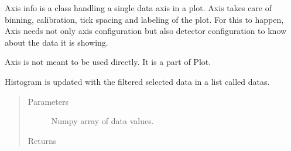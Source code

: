 \documentclass[letterpaper,10pt,english]{sphinxmanual}
\begin{document}
\begin{fulllineitems}
\label{\detokenize{autodocs/plot:listmode.plot.Axis}}
\sphinxAtStartPar
Axis info is a class handling a single data axis in a plot. Axis takes care of binning, calibration, tick spacing
and labeling of the plot. For this to happen, Axis needs not only axis configuration but also detector configuration
to know about the data it is showing.

\sphinxAtStartPar
Axis is not meant to be used directly. It is a part of Plot.

\begin{fulllineitems}
\label{\detokenize{autodocs/plot:listmode.plot.Axis.update}}
\sphinxAtStartPar
Histogram is updated with the filtered selected data in a list called datas.
\begin{quote}\begin{description}
\item[{Parameters}] \leavevmode
\sphinxAtStartPar
{} \textendash{} Numpy array of data values.

\item[{Returns}] \leavevmode
\sphinxAtStartPar


\end{description}\end{quote}

\end{fulllineitems}


\end{fulllineitems}

\end{document}
